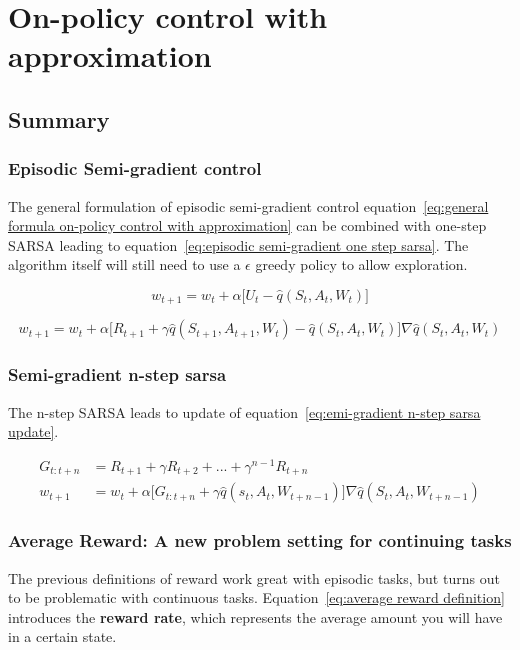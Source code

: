 \chapter{On-policy control with approximation}

\section{Summary}

\subsection{Episodic Semi-gradient control}

The general formulation of episodic semi-gradient control equation~\ref{eq:general formula on-policy control with approximation} can be combined with one-step SARSA leading to equation~\ref{eq:episodic semi-gradient one step sarsa}. The algorithm itself will still need to use a $\epsilon$ greedy policy to allow exploration.

\begin{equation}
	w_{t+1} = w_t + \alpha \big[ U_t - \hat{q}(S_t, A_t, W_t) \big] 
\label{eq:general formula on-policy control with approximation}
\end{equation}

\begin{equation}
w_{t+1} = w_t + \alpha \big[R_{t+1} + \gamma\hat{q}(S_{t+1}, A_{t+1},W_t) - \hat{q}(S_t, A_t, W_t) \big] \nabla \hat{q}(S_t, A_t, W_t)
\label{eq:episodic semi-gradient one step sarsa}
\end{equation}

\subsection{Semi-gradient n-step sarsa}
The n-step SARSA leads to update of equation~\ref{eq:emi-gradient n-step sarsa update}.

\begin{equation}
\begin{split}
G_{t:t+n} & = R_{t+1} + \gamma R_{t+2} + ... + \gamma^{n-1} R_{t+n} \\
w_{t+1} & = w_t + \alpha \big[G_{t:t+n} + \gamma \hat{q}(s_{t}, A_{t}, W_{t+n-1}) \big] \nabla \hat{q}(S_{t}, A_{t}, W_{t+n-1})
\end{split}
\label{eq:semi-gradient n-step sarsa update}
\end{equation}

\subsection{Average Reward: A new problem setting for continuing tasks}
The previous definitions of reward work great with episodic tasks, but turns out to be problematic with continuous tasks. Equation~\ref{eq:average reward definition}
introduces the \textbf{reward rate}, which represents the average amount you will have in a certain state. 

